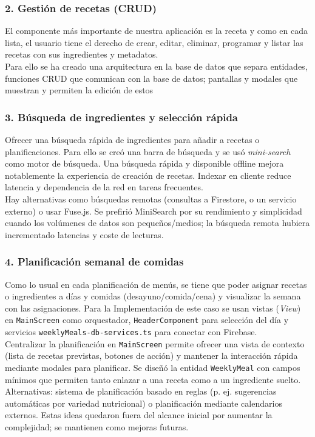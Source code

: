 \documentclass[twoside, openright, 11pt]{report}
\begin{document}
		\subsubsection{2. Gestión de recetas (CRUD)}
		El componente más importante de nuestra aplicación es la receta y como en cada lista, el usuario tiene el derecho de crear, editar, eliminar, programar y listar las recetas con sus ingredientes y metadatos.\\
		Para ello se ha creado una arquitectura en la base de datos que separa entidades, funciones CRUD que comunican con la base de datos; pantallas y modales que muestran y permiten la edición de estos
		
		\subsubsection{3. Búsqueda de ingredientes y selección rápida}
		Ofrecer una búsqueda rápida de ingredientes para añadir a recetas o planificaciones. Para ello se creó una barra de búsqueda y se usó \textit{mini-search} como motor de búsqueda. Una búsqueda rápida y disponible offline mejora notablemente la experiencia de creación de recetas. Indexar en cliente reduce latencia y dependencia de la red en tareas frecuentes.\\
		Hay alternativas como búsquedas remotas (consultas a Firestore, o un servicio externo) o usar Fuse.js. Se prefirió MiniSearch por su rendimiento y simplicidad cuando los volúmenes de datos son pequeños/medios; la búsqueda remota hubiera incrementado latencias y coste de lecturas.
		
		\subsubsection{4. Planificación semanal de comidas}
		Como lo usual en cada planificación de menús, se tiene que poder asignar recetas o ingredientes a días y comidas (desayuno/comida/cena) y visualizar la semana con las asignaciones.  
		Para la Implementación de este caso se usan vistas (\textit{View}) en \texttt{MainScreen} como orquestador, \texttt{HeaderComponent} para selección del día y servicios \texttt{weeklyMeals-db-services.ts} para conectar con Firebase.\\
		Centralizar la planificación en \texttt{MainScreen} permite ofrecer una vista de contexto (lista de recetas previstas, botones de acción) y mantener la interacción rápida mediante modales para planificar. Se diseñó la entidad \texttt{WeeklyMeal} con campos mínimos que permiten tanto enlazar a una receta como a un ingrediente suelto.  
		Alternativas: sistema de planificación basado en reglas (p. ej. sugerencias automáticas por variedad nutricional) o planificación mediante calendarios externos. Estas ideas quedaron fuera del alcance inicial por aumentar la complejidad; se mantienen como mejoras futuras.
		
\end{document}
